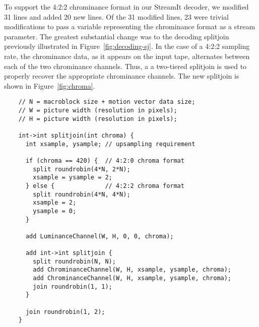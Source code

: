 To support the 4:2:2 chrominance format in our StreamIt decoder, we
modified 31 lines and added 20 new lines. Of the 31 modified lines, 23
were trivial modifications to pass a variable representing the
chrominance format as a stream parameter. The greatest substantial
change was to the decoding splitjoin previously illustrated in
Figure~\ref{fig:decoding-sj}. In the case of a 4:2:2 sampling rate,
the chrominance data, as it appears on the input tape, alternates
between each of the two chrominance channels. Thus, a a two-tiered
splitjoin is used to properly recover the appropriate chrominance
channels. The new splitjoin is shown in Figure~\ref{fig:chroma}.
\begin{figure*}[t]
 \begin{minipage}[t]{4.3in}
   {
    \begin{scriptsize}
    \begin{verbatim} 
    // N = macroblock size + motion vector data size;
    // W = picture width (resolution in pixels);
    // H = picture width (resolution in pixels);

    int->int splitjoin(int chroma) {
      int xsample, ysample; // upsampling requirement

      if (chroma == 420) {  // 4:2:0 chroma format
        split roundrobin(4*N, 2*N);
        xsample = ysample = 2;
      } else {              // 4:2:2 chroma format
        split roundrobin(4*N, 4*N);
        xsample = 2;
        ysample = 0;
      }

      add LuminanceChannel(W, H, 0, 0, chroma);

      add int->int splitjoin {
        split roundrobin(N, N);
        add ChrominanceChannel(W, H, xsample, ysample, chroma);
        add ChrominanceChannel(W, H, xsample, ysample, chroma);
        join roundrobin(1, 1);
      }

      join roundrobin(1, 2);
    }
    \end{verbatim}
    \end{scriptsize}
   }
  \end{minipage}
  ~~\vrule~~
  \begin{minipage}[t]{2.0in}
  {
   \begin{center}
   \end{center}
  }
  \end{minipage}
  \caption{Decoding stream to handle 4:2:0 and 4:2:2 chroma
    formats. Figures on right illustrate how macroblock orderings
    differ.}
  \label{fig:chroma}
\end{figure*}



